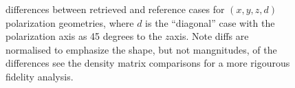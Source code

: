 \documentclass[letterpaper,table,10pt,english]{jupyterBook}
\begin{document}
\begin{figure}[htbp]
\centering
\capstart

\noindent{}
\caption{{\hyperref[\detokenize{backmatter/glossary:term-MF}]{}} differences between retrieved and reference cases for \((x,y,z,d)\) polarization geometries, where \(d\) is the “diagonal” case with the polarization axis as 45 degrees to the \(z\)\sphinxhyphen{}axis. Note diffs are normalised to emphasize the shape, but not mangnitudes, of the differences \sphinxhyphen{} see the density matrix comparisons for a more rigourous fidelity analysis.}\label{\detokenize{part2/case-study-C2H4_290723:fig-c2h4-diff}}\end{figure}
\end{document}
